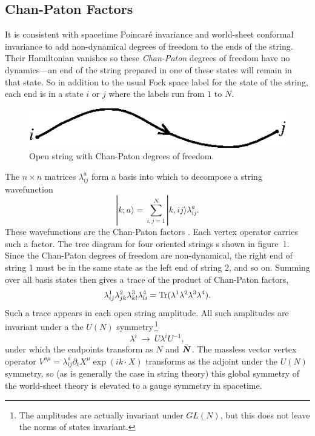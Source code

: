 \documentclass[12pt]{article}
\def\be{\begin{equation}}
\def\ee{\end{equation}}
\def\Tr{{\rm Tr}}
\newcommand{\mbf}[1]{\mbox{\boldmath $#1$}}
\begin{document}
\subsection{Chan-Paton Factors}

It is consistent with spacetime Poincar\'e invariance and world-sheet
conformal invariance to add non-dynamical degrees of freedom to the ends of
the string. Their Hamiltonian vanishes so these {\it Chan-Paton} degrees of
freedom have no dynamics---an end of the string prepared in one of these
states will remain in that state.  So in addition to the usual Fock
space label for the state of the string,
each end is in a state $i$ or $j$ where the labels run from $1$ to $N$.
\begin{figure}
\begin{center}
\leavevmode
\includegraphics{chan.eps}
\end{center}
\caption[]{Open string with Chan-Paton degrees of freedom.}
\end{figure}
The $n\times n$ matrices $\lambda^a_{ij}$ form a basis into which to
decompose a string wavefunction
\be
|{ k};a\rangle = \sum^N_{i,j=1}|{k},ij\rangle\lambda^a_{ij}.
\ee
These wavefunctions are the Chan-Paton
factors \cite{chan}.  Each vertex operator carries such a factor.
The tree
diagram for four oriented strings s shown in figure~1.
Since the Chan-Paton degrees of freedom are non-dynamical, the right end of
string 1 must be in the same state as the left end of string 2, and so on.
Summing over all basis states then gives a trace of the product of Chan-Paton
factors,
\be
\lambda^1_{ij}\lambda^2_{jk}\lambda^3_{kl}
\lambda^4_{li} = \Tr(\lambda^1\lambda^2\lambda^3\lambda^4). \label{factor}
\ee
Such a trace appears in each open string amplitude.
All such amplitudes are invariant under a the $U(N)$ symmetry\,\footnote
{The amplitudes are actually invariant under $GL(N)$, but this does not
leave the norms of states invariant.} 
\be
\lambda^i \ \to\ U \lambda^i U^{-1},
\ee
under which the endpoints transform as \mbf{N} and $\bar{\mbf{N}}$.
The massless vector vertex operator
$V^{a\mu}= \lambda^a_{ij}\partial_t X^\mu\exp(i{ k}\cdot { X})$
transforms as the adjoint under the $U(N)$ symmetry, so (as is generally the
case in string theory) this global symmetry of the world-sheet theory is
elevated to a gauge symmetry in spacetime.
\end{document}
